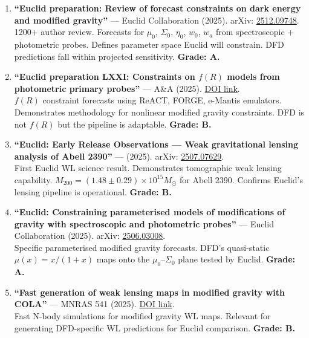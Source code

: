 \documentclass[11pt,a4paper]{article}
\begin{document}
\begin{enumerate}
\item \textbf{``Euclid preparation: Review of forecast constraints on dark energy and modified gravity''} --- Euclid Collaboration (2025). arXiv: \href{https://arxiv.org/abs/2512.09748}{2512.09748}.\\
1200+ author review. Forecasts for $\mu_0$, $\Sigma_0$, $\eta_0$, $w_0$, $w_a$ from spectroscopic + photometric probes. Defines parameter space Euclid will constrain. DFD predictions fall within projected sensitivity. \textbf{Grade: A.}

\item \textbf{``Euclid preparation LXXI: Constraints on $f(R)$ models from photometric primary probes''} --- A\&A (2025). \href{https://www.aanda.org/articles/aa/full_html/2025/06/aa52184-24/aa52184-24.html}{DOI link}.\\
$f(R)$ constraint forecasts using ReACT, FORGE, e-Mantis emulators. Demonstrates methodology for nonlinear modified gravity constraints. DFD is not $f(R)$ but the pipeline is adaptable. \textbf{Grade: B.}

\item \textbf{``Euclid: Early Release Observations --- Weak gravitational lensing analysis of Abell 2390''} --- (2025). arXiv: \href{https://arxiv.org/abs/2507.07629}{2507.07629}.\\
First Euclid WL science result. Demonstrates tomographic weak lensing capability. $M_{200} = (1.48 \pm 0.29) \times 10^{15} M_\odot$ for Abell 2390. Confirms Euclid's lensing pipeline is operational. \textbf{Grade: B.}

\item \textbf{``Euclid: Constraining parameterised models of modifications of gravity with spectroscopic and photometric probes''} --- Euclid Collaboration (2025). arXiv: \href{https://arxiv.org/abs/2506.03008}{2506.03008}.\\
Specific parameterised modified gravity forecasts. DFD's quasi-static $\mu(x) = x/(1+x)$ maps onto the $\mu_0$--$\Sigma_0$ plane tested by Euclid. \textbf{Grade: A.}

\item \textbf{``Fast generation of weak lensing maps in modified gravity with COLA''} --- MNRAS 541 (2025). \href{https://academic.oup.com/mnras/article/541/4/3167/8182612}{DOI link}.\\
Fast N-body simulations for modified gravity WL maps. Relevant for generating DFD-specific WL predictions for Euclid comparison. \textbf{Grade: B.}
\end{enumerate}
\end{document}
